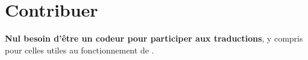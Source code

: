 \documentclass{tutodoc}
\begin{document}
\section{Contribuer}

\begin{tdocnote}
    \textbf{Nul besoin d'être un codeur pour participer aux traductions}, y compris pour celles utiles au fonctionnement de \thisproj.
\end{tdocnote}
\end{document}
